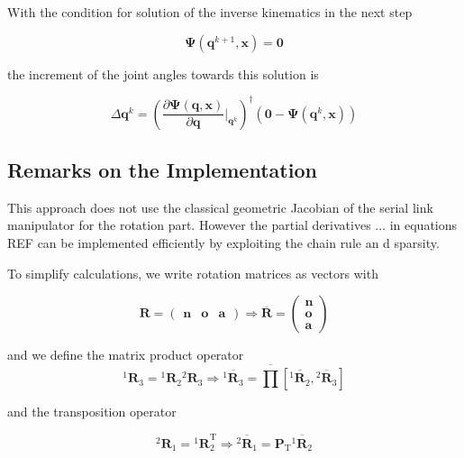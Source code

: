 \documentclass[twocolumn,10pt]{IFTOMM}
\newcommand{\bm}[1]{\boldsymbol{#1}}
\newcommand{\rotmat}[2]{{{ }^{#1}\boldsymbol{R}}_{#2}}
\newcommand{\transp}[0]{{\mathrm{T}}}
\begin{document}
With the condition for solution of the inverse kinematics in the next step

\begin{equation}
\bm{\Psi}(\bm{q}^{k+1},\bm{x})=\bm{0}
\end{equation}

the increment of the joint angles towards this solution is

\begin{equation}
\Delta \bm{q}^k
=
\left(\frac{\partial \bm{\Psi}(\bm{q},\bm{x})}{\partial \bm{q}}\biggr\rvert_{\bm{q}^k}\right)^{\dagger}
(\bm{0} - \bm{\Psi}(\bm{q}^{k},\bm{x}))
\end{equation}  




\subsection{Remarks on the Implementation}
\label{sec:RecEulAng_implement}
This approach does not use the classical geometric Jacobian of the serial link manipulator for the rotation part.
However the partial derivatives ... in equations REF can be implemented efficiently by exploiting the chain rule an d sparsity.

To simplify calculations, we write rotation matrices as vectors with

\begin{equation}
\bm{R}=\begin{pmatrix}
\bm{n} & \bm{o} & \bm{a}
\end{pmatrix}
\Rightarrow
\overline{\bm{R}}=\begin{pmatrix}
\bm{n} \\ \bm{o} \\ \bm{a}
\end{pmatrix}
\end{equation}

and we define the matrix product operator
\begin{equation}
\rotmat{1}{3}
=
\rotmat{1}{2}
\rotmat{2}{3}
\Rightarrow
\overline{\rotmat{1}{3}}
=
\overline{\prod}\left[ \overline{\rotmat{1}{2}}, \overline{\rotmat{2}{3}}\right]
\label{equ:matprod}
\end{equation}

and the transposition operator

\begin{equation}
\rotmat{2}{1}
=
\rotmat{1}{2}^\transp
\Rightarrow
\overline{\rotmat{2}{1}}
=
\bm{P}_\transp \overline{\rotmat{1}{2}}
\end{equation}
\end{document}
